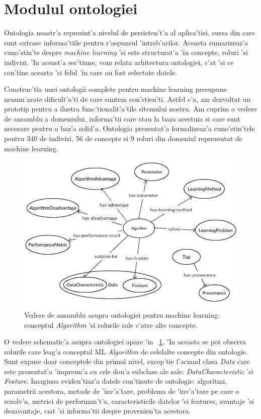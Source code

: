 \documentclass[12pt,a4paper,twoside]{report}
\begin{document}
\section{Modulul ontologiei}
Ontologia noastr'a reprezint'a nivelul de persisten't'a al aplica'tiei, sursa din care sunt extrase informa'tiile pentru r'aspunsul 'intreb'arilor. Aceasta sumarizeaz'a cuno'stin'te despre {\it machine learning} 'si este structurat'a 'in concepte, roluri 'si indivizi. 'In aceast'a sec'tiune, vom relata arhitectura ontologiei, c'at 'si ce con'tine aceasta 'si felul 'in care au fost selectate datele. 

Construc'tia unei ontologii complete pentru machine learning presupune nenum'arate dificult'a'ti de care suntem con'stien'ti. Astfel c'a, am dezvoltat un prototip pentru a ilustra func'tionalit'a'tile sitemului nostru. Am cuprins o vedere de ansamblu a domeniului, informa'tii care stau la baza acestuia si care sunt necesare pentru o baz'a solid'a. Ontologia prezentat'a formalizeaz'a cuno'stin'tele pentru 340 de indivizi, 56 de concepte si 9 roluri din domeniul reprezentat de machine learning.

\begin{figure}[ht]
    \centering
    \includegraphics[width = 0.85 \linewidth]{img/ontologie_black.png}
        \caption{Vedere de ansamblu asupra ontologiei pentru machine learning: conceptul {\it Algorithm} 'si rolurile sale c'atre alte concepte.}
    \label{fig:onto}
\end{figure}

O vedere schematic'a asupra ontologiei apare 'in ~\ref{fig:onto}. 'In aceasta se pot observa rolurile care leag'a conceptul ML {\it Algorithm} de celelalte concepte din ontologie. Sunt expuse doar conceptele din primul nivel, excep'tie f'ac\i and clasa {\it Data} care este prezentat'a 'impreun'a cu cele dou'a subclase ale sale: {\it DataCharacteristic} 'si {\it Feature}. Imaginea eviden'tiaz'a datele con'tinute de ontologie: algoritmi, parametrii acestora, metode de 'inv'a'tare, problema de 'inv'a'tare pe care o rezolv'a, metrici de performan't'a, caracteristicile datelor 'si features, avantaje 'si dezavantaje, c\i at 'si informa'tii despre provenien'ta acestora.
\end{document}
